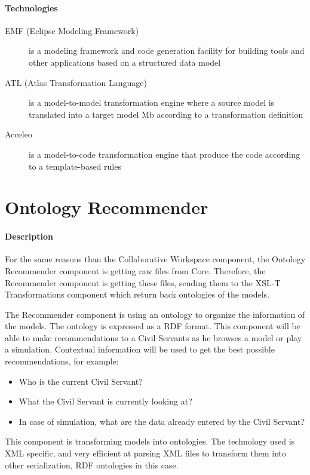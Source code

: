 \documentclass{learnpad}
\begin{document}
\paragraph{Technologies}
\begin{description}
	\item[EMF (Eclipse Modeling Framework)] is a modeling framework and code generation facility for building tools and other applications based on a structured data model
	\item[ATL (Atlas Transformation Language)] is a model-to-model transformation engine where a source model is translated into a target model Mb according to a transformation definition
	\item[Acceleo] is a model-to-code transformation engine that produce the code according to a template-based rules
\end{description}

\section{Ontology Recommender}\label{sec:ontology-recommender}
\paragraph{Description}
For the same reasons than the Collaborative Workspace component, the Ontology
Recommender component is getting raw files from \learnpad Core.  Therefore, the
Recommender component is getting these files, sending them to the XSL-T
Transformations component which return back ontologies of the models.

The Recommender component is using an ontology to organize the information of
the models.  The ontology is expressed as a RDF format.  This component will be
able to make recommendations to a Civil Servants as he browses a model or play a
simulation.  Contextual information will be used to get the best possible
recommendations, for example:
\begin{itemize}
	\item Who is the current Civil Servant?
	\item What the Civil Servant is currently looking at?
	\item In case of simulation, what are the data already entered by the Civil
		Servant?
\end{itemize}

This component is transforming models into ontologies.  The technology used is
XML specific, and very efficient at parsing XML files to transform them into
other serialization, RDF ontologies in this case.
\end{document}
